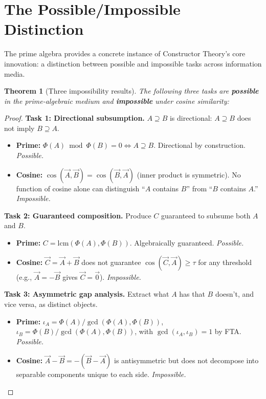 \documentclass[11pt,a4paper]{article}
\newtheorem{theorem}{Theorem}
\begin{document}
\section{The Possible/Impossible Distinction}
\label{sec:impossible}

The prime algebra provides a concrete instance of Constructor
Theory's core innovation: a distinction between possible and
impossible tasks across information media.

\begin{theorem}[Three impossibility results]
\label{thm:impossible}
The following three tasks are \textbf{possible} in the
prime-algebraic medium and \textbf{impossible} under cosine
similarity:
\end{theorem}

\begin{proof}
\textbf{Task 1: Directional subsumption.}
$A\supseteq B$ is directional: $A\supseteq B$ does not imply
$B\supseteq A$.
\begin{itemize}[nosep]
\item \textbf{Prime:} $\Phi(A)\bmod\Phi(B)=0\iff A\supseteq B$.
  Directional by construction. \textit{Possible.}
\item \textbf{Cosine:} $\cos(\vec{A},\vec{B})=
  \cos(\vec{B},\vec{A})$ (inner product is symmetric). No function
  of cosine alone can distinguish ``$A$ contains $B$'' from
  ``$B$ contains $A$.'' \textit{Impossible.}
\end{itemize}

\textbf{Task 2: Guaranteed composition.}
Produce $C$ guaranteed to subsume both $A$ and $B$.
\begin{itemize}[nosep]
\item \textbf{Prime:} $C=\mathrm{lcm}(\Phi(A),\Phi(B))$.
  Algebraically guaranteed. \textit{Possible.}
\item \textbf{Cosine:} $\vec{C}=\vec{A}+\vec{B}$ does not
  guarantee $\cos(\vec{C},\vec{A})\geq\tau$ for any threshold
  (e.g., $\vec{A}=-\vec{B}$ gives $\vec{C}=\vec{0}$).
  \textit{Impossible.}
\end{itemize}

\textbf{Task 3: Asymmetric gap analysis.}
Extract what $A$ has that $B$ doesn't, and vice versa, as
distinct objects.
\begin{itemize}[nosep]
\item \textbf{Prime:}
  $\iota_A=\Phi(A)/\gcd(\Phi(A),\Phi(B))$,
  $\iota_B=\Phi(B)/\gcd(\Phi(A),\Phi(B))$, with
  $\gcd(\iota_A,\iota_B)=1$ by FTA. \textit{Possible.}
\item \textbf{Cosine:} $\vec{A}-\vec{B}=-(\vec{B}-\vec{A})$ is
  antisymmetric but does not decompose into separable components
  unique to each side. \textit{Impossible.}
\end{itemize}
\end{proof}
\end{document}

